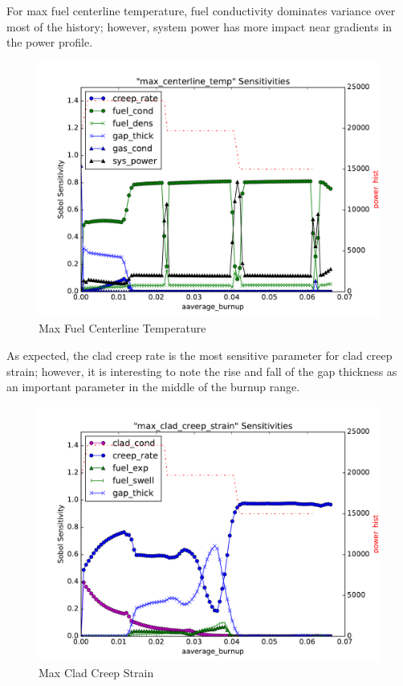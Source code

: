 \documentclass{anstrans} \usepackage{amsmath} \usepackage{amssymb}
\begin{document}
For max fuel centerline temperature,
fuel conductivity  dominates variance over most of the history; however, system
power has more impact near gradients in the power profile.
\begin{figure}
  \centering
  \includegraphics[width=\linewidth]{./sens_max_centerline_temp}
  \caption{Max Fuel Centerline Temperature}
  \label{fig:centerline}
\end{figure}

As expected, the clad creep rate is the most sensitive parameter for clad creep strain; however, it is
interesting to note the rise and fall of the gap thickness as an important parameter in the middle of the
burnup range.
\begin{figure}
  \centering
  \includegraphics[width=\linewidth]{./sens_max_clad_creep_strain}
  \caption{Max Clad Creep Strain}
  \label{fig:strain}
\end{figure}
\end{document}
